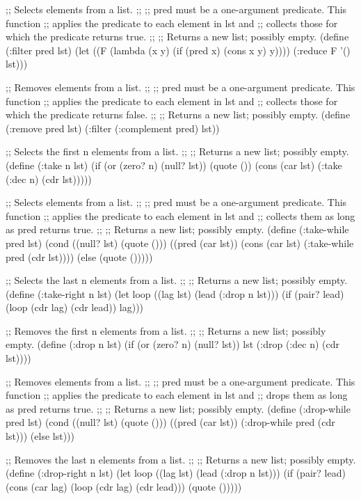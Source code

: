 ;; Selects elements from a list.
;;
;; pred must be a one-argument predicate. This function
;; applies the predicate to each element in lst and
;; collects those for which the predicate returns true.
;;
;; Returns a new list; possibly empty.
(define (:filter pred lst)
  (let ((F (lambda (x y) (if (pred x) (cons x y) y))))
    (:reduce F '() lst)))


;; Removes elements from a list.
;;
;; pred must be a one-argument predicate. This function
;; applies the predicate to each element in lst and
;; collects those for which the predicate returns false.
;;
;; Returns a new list; possibly empty.
(define (:remove pred lst)
  (:filter (:complement pred) lst))


;; Selects the first n elements from a list.
;;
;; Returns a new list; possibly empty.
(define (:take n lst)
  (if (or (zero? n) (null? lst))
    (quote ())
    (cons (car lst) (:take (:dec n) (cdr lst)))))


;; Selects elements from a list.
;;
;; pred must be a one-argument predicate. This function
;; applies the predicate to each element in lst and
;; collects them as long as pred returns true.
;;
;; Returns a new list; possibly empty.
(define (:take-while pred lst)
  (cond ((null? lst)      (quote ()))
        ((pred (car lst)) (cons (car lst) (:take-while pred (cdr lst))))
        (else             (quote ()))))


;; Selects the last n elements from a list.
;;
;; Returns a new list; possibly empty.
(define (:take-right n lst)
  (let loop ((lag lst) (lead (:drop n lst)))
    (if (pair? lead)
      (loop (cdr lag) (cdr lead))
      lag)))


;; Removes the first n elements from a list.
;;
;; Returns a new list; possibly empty.
(define (:drop n lst)
  (if (or (zero? n) (null? lst))
    lst
    (:drop (:dec n) (cdr lst))))


;; Removes elements from a list.
;;
;; pred must be a one-argument predicate. This function
;; applies the predicate to each element in lst and
;; drops them as long as pred returns true.
;;
;; Returns a new list; possibly empty.
(define (:drop-while pred lst)
  (cond ((null? lst)      (quote ()))
        ((pred (car lst)) (:drop-while pred (cdr lst)))
        (else             lst)))


;; Removes the last n elements from a list.
;;
;; Returns a new list; possibly empty.
(define (:drop-right n lst)
  (let loop ((lag lst) (lead (:drop n lst)))
    (if (pair? lead)
      (cons (car lag) (loop (cdr lag) (cdr lead)))
      (quote ()))))


